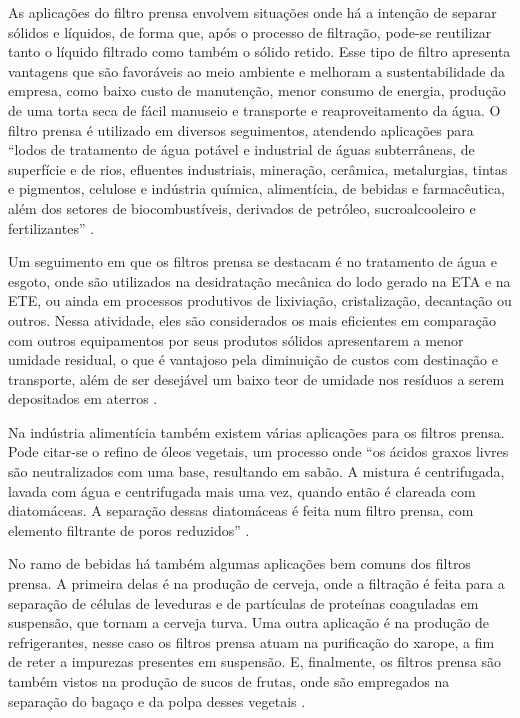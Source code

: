 As aplicações do filtro prensa envolvem situações onde há a intenção de separar
sólidos e líquidos, de forma que, após o processo de filtração, pode-se
reutilizar tanto o líquido filtrado como também o sólido retido. Esse tipo de
filtro apresenta vantagens que são favoráveis ao meio ambiente e melhoram a
sustentabilidade da empresa, como baixo custo de manutenção, menor consumo de
energia, produção de uma torta seca de fácil manuseio e transporte e
reaproveitamento da água. O filtro prensa é utilizado em diversos seguimentos,
atendendo aplicações para ``lodos de tratamento de água potável e industrial de
águas subterrâneas, de superfície e de rios, efluentes industriais, mineração,
cerâmica, metalurgias, tintas e pigmentos, celulose e indústria química,
alimentícia, de bebidas e farmacêutica, além dos setores de biocombustíveis,
derivados de petróleo, sucroalcooleiro e fertilizantes'' .

Um seguimento em que os filtros prensa se destacam é no tratamento de água e
esgoto, onde são utilizados na desidratação mecânica do lodo gerado na ETA e na
ETE, ou ainda em processos produtivos de lixiviação, cristalização, decantação
ou outros. Nessa atividade, eles são considerados os mais eficientes em
comparação com outros equipamentos por seus produtos sólidos apresentarem a
menor umidade residual, o que é vantajoso pela diminuição de custos com
destinação e transporte, além de ser desejável um baixo teor de umidade nos
resíduos a serem depositados em aterros .

Na indústria alimentícia também existem várias aplicações para os filtros
prensa. Pode citar-se o refino de óleos vegetais, um processo onde ``os ácidos
graxos livres são neutralizados com uma base, resultando em sabão. A mistura é
centrifugada, lavada com água e centrifugada mais uma vez, quando então é
clareada com diatomáceas. A separação dessas diatomáceas é feita num filtro
prensa, com elemento filtrante de poros reduzidos'' .

No ramo de bebidas há também algumas aplicações bem comuns dos filtros prensa. A
primeira delas é na produção de cerveja, onde a filtração é feita para a
separação de células de leveduras e de partículas de proteínas coaguladas em
suspensão, que tornam a cerveja turva. Uma outra aplicação é na produção de
refrigerantes, nesse caso os filtros prensa atuam na purificação do xarope, a
fim de reter a impurezas presentes em suspensão. E, finalmente, os filtros
prensa são também vistos na produção de sucos de frutas, onde são empregados na
separação do bagaço e da polpa desses vegetais .

